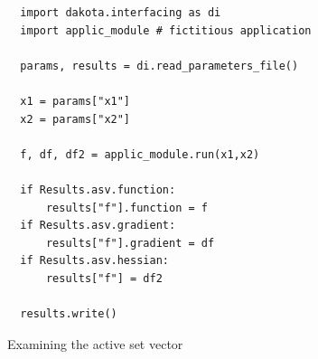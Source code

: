 \begin{figure}
\begin{bigbox}
\begin{small}
\begin{verbatim}
  import dakota.interfacing as di
  import applic_module # fictitious application

  params, results = di.read_parameters_file()

  x1 = params["x1"]
  x2 = params["x2"]

  f, df, df2 = applic_module.run(x1,x2)

  if Results.asv.function:
      results["f"].function = f
  if Results.asv.gradient:
      results["f"].gradient = df
  if Results.asv.hessian:
      results["f"] = df2

  results.write()
\end{verbatim}


\end{small}
\end{bigbox}
\caption{Examining the active set vector}
\label{diexample:asv}
\end{figure}


